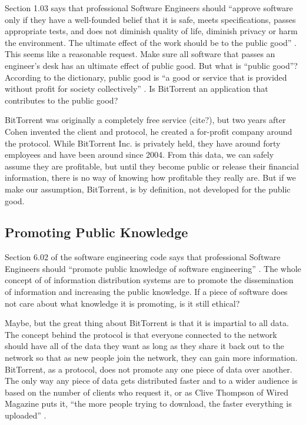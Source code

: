 \documentclass[11pt]{article}
\begin{document}
Section 1.03 says that professional Software Engineers should ``approve software only if they have a well-founded belief that it is safe, meets specifications, passes appropriate tests, and does not diminish quality of life, diminish privacy or harm the environment. The ultimate effect of the work should be to the public good'' \cite[1.03]{secode}. This seems like a reasonable request. Make sure all software that passes an engineer's desk has an ultimate effect of public good. But what is ``public good''? According to the dictionary, public good is ``a good or service that is provided without profit for society collectively'' \cite{pubgooddef}. Is BitTorrent an application that contributes to the public good?

BitTorrent was originally a completely free service (cite?), but two years after Cohen invented the client and protocol, he created a for-profit company around the protocol. While BitTorrent Inc. is privately held, they have around forty employees and have been around since 2004. From this data, we can safely assume they are profitable, but until they become public or release their financial information, there is no way of knowing how profitable they really are. But if we make our assumption, BitTorrent, is by definition, not developed for the public good.

\subsection{Promoting Public Knowledge}

Section 6.02 of the software engineering code says that professional Software Engineers should ``promote public knowledge of software engineering'' \cite[6.02]{secode}. The whole concept of of information distribution systems are to promote the dissemination of information and increasing the public knowledge. If a piece of software does not care about what knowledge it is promoting, is it still ethical?

Maybe, but the great thing about BitTorrent is that it is impartial to all data. The concept behind the protocol is that everyone connected to the network should have all of the data they want as long as they share it back out to the network so that as new people join the network, they can gain more information. BitTorrent, as a protocol, does not promote any one piece of data over another. The only way any piece of data gets distributed faster and to a wider audience is based on the number of clients who request it, or as Clive Thompson of Wired Magazine puts it, ``the more people trying to download, the faster everything is uploaded'' \cite{wiredbt}.
\end{document}
